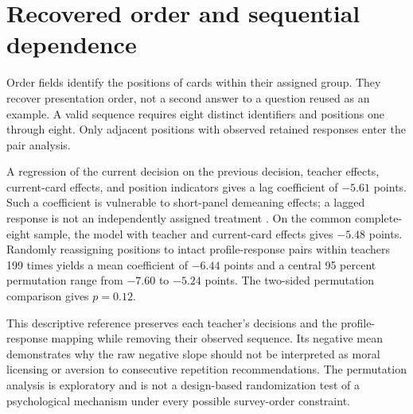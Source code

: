 \section{Recovered order and sequential dependence}\label{app:sequence}
\begin{addition}
Order fields identify the positions of cards within their assigned group. They recover presentation order, not a second answer to a question reused as an example. A valid sequence requires eight distinct identifiers and positions one through eight. Only adjacent positions with observed retained responses enter the pair analysis.

A regression of the current decision on the previous decision, teacher effects, current-card effects, and position indicators gives a lag coefficient of $-5.61$ points. Such a coefficient is vulnerable to short-panel demeaning effects; a lagged response is not an independently assigned treatment \cite{nickell}. On the common complete-eight sample, the model with teacher and current-card effects gives $-5.48$ points. Randomly reassigning positions to intact profile-response pairs within teachers 199 times yields a mean coefficient of $-6.44$ points and a central 95 percent permutation range from $-7.60$ to $-5.24$ points. The two-sided permutation comparison gives $p=0.12$.

This descriptive reference preserves each teacher's decisions and the profile-response mapping while removing their observed sequence. Its negative mean demonstrates why the raw negative slope should not be interpreted as moral licensing or aversion to consecutive repetition recommendations. The permutation analysis is exploratory and is not a design-based randomization test of a psychological mechanism under every possible survey-order constraint.
\end{addition}

